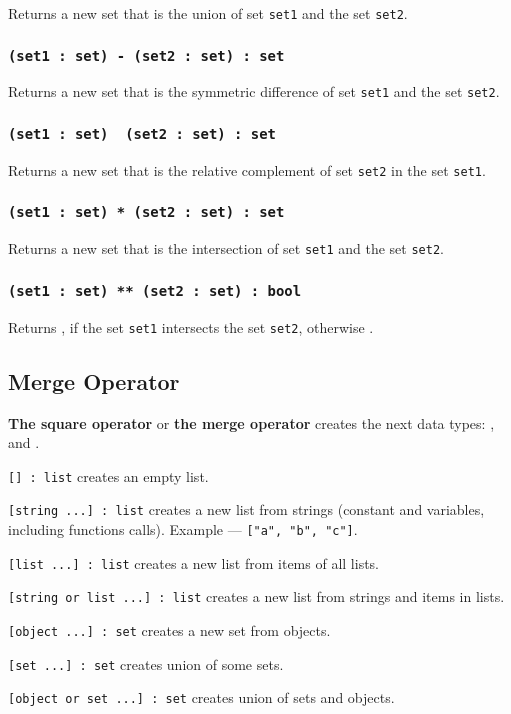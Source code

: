 Returns a new set that is the union of set \texttt{set1} and the set \texttt{set2}.

\subsubsection{\texttt{(set1 : set) - (set2 : set) : set}}

Returns a new set that is the symmetric difference of set \texttt{set1} and the set \texttt{set2}.

\subsubsection{\texttt{(set1 : set) \ (set2 : set) : set}}

Returns a new set that is the relative complement of set \texttt{set2} in the set \texttt{set1}.

\subsubsection{\texttt{(set1 : set) * (set2 : set) : set}}

Returns a new set that is the intersection of set \texttt{set1} and the set \texttt{set2}.

\subsubsection{\texttt{(set1 : set) ** (set2 : set) : bool}}

Returns \true, if the set \texttt{set1} intersects the set \texttt{set2}, otherwise \false.

\subsection{Merge Operator}

{\bf The square operator} or {\bf the merge operator} creates the next data types: \listtype{}, \set{} and \object{}.

\texttt{[] : list} creates an empty list.

\texttt{[string ...] : list} creates a new list from strings (constant and variables, including functions calls). Example —  \texttt{["a", "b", "c"]}.

\texttt{[list ...] : list} creates a new list from items of all lists.

\texttt{[string or list ...] : list} creates a new list from strings and items in lists.

\texttt{[object ...] : set} creates a new set from objects.

\texttt{[set ...] : set} creates union of some sets.

\texttt{[object or set ...] : set} creates union of sets and objects.

